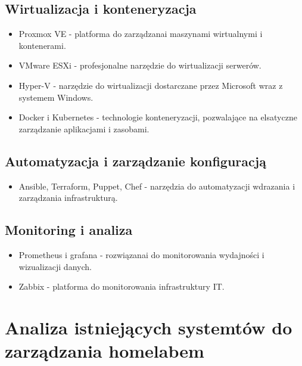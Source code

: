 \subsection{Wirtualizacja i konteneryzacja}
\begin{itemize}
    \item Proxmox VE - platforma do zarządzanai maszynami wirtualnymi i kontenerami.
    \item VMware ESXi - profesjonalne narzędzie do wirtualizacji serwerów.
    \item Hyper-V - narzędzie do wirtualizacji dostarczane przez Microsoft wraz z systemem Windows.
    \item Docker i Kubernetes - technologie konteneryzacji, pozwalające na elsatyczne zarządzanie aplikacjami i zasobami.
\end{itemize}

\subsection{Automatyzacja i zarządzanie konfiguracją}

\begin{itemize}
    \item Ansible, Terraform, Puppet, Chef - narzędzia do automatyzacji wdrazania i zarządzania infrastrukturą.
\end{itemize}

\subsection{Monitoring i analiza}
\begin{itemize}
    \item Prometheus i grafana - rozwiązanai do monitorowania wydajności i wizualizacji danych.
    \item Zabbix - platforma do monitorowania infrastruktury IT.
\end{itemize}

\section{Analiza istniejących systemtów do zarządzania homelabem}
